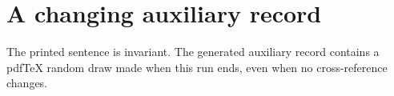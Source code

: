 \documentclass{article}
\begin{document}
\section*{A changing auxiliary record}
The printed sentence is invariant. The generated auxiliary record contains a
pdfTeX random draw made when this run ends, even when no cross-reference changes.
\end{document}
